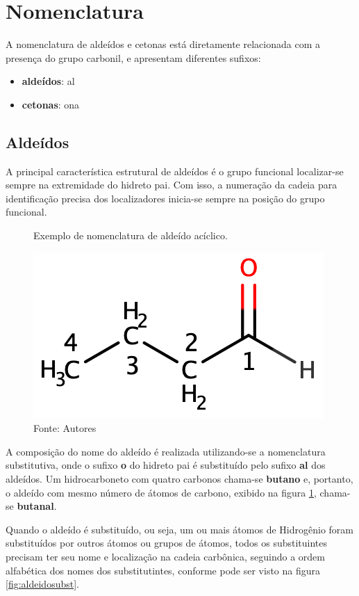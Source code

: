 \section{Nomenclatura}
A nomenclatura de aldeídos e cetonas está diretamente relacionada com a presença do grupo carbonil, e apresentam diferentes sufixos:
 \begin{itemize}
	\item \textbf{aldeídos}: al
	\item \textbf{cetonas}: ona
 \end{itemize}

 \subsection{Aldeídos}
A principal característica estrutural de aldeídos é o grupo funcional localizar-se sempre na extremidade do hidreto pai. Com isso, a numeração da cadeia para identificação precisa dos localizadores inicia-se sempre na posição do grupo funcional.

\begin{figure}[h]
	\centering
	\vspace{0.25cm}
	\caption{Exemplo de nomenclatura de aldeído acíclico.}
	\vspace{0.25cm}
	\includegraphics[width=0.45\linewidth]{imagens/butanal.png}
	\caption*{Fonte: Autores}
	\label{fig:butanal}
\end{figure}

A composição do nome do aldeído é realizada utilizando-se a nomenclatura substitutiva, onde o sufixo \textbf{o} do hidreto pai é substituído pelo sufixo \textbf{al} dos aldeídos. Um hidrocarboneto com quatro carbonos chama-se \textbf{butano} e, portanto, o aldeído com mesmo número de átomos de carbono, exibido na figura \ref{fig:butanal}, chama-se \textbf{butanal}.

Quando o aldeído é substituído, ou seja, um ou mais átomos de Hidrogênio foram substituídos por outros átomos ou grupos de átomos, todos os substituintes precisam ter seu nome e localização na cadeia carbônica, seguindo a ordem alfabética dos nomes dos substitutintes, conforme pode ser visto na figura \ref{fig:aldeidosubst}.

